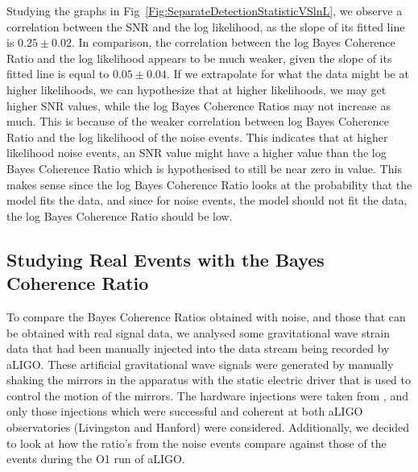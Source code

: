 \documentclass{article}
\begin{document}
     Studying the graphs in Fig~\ref{Fig:SeparateDetectionStatisticVSlnL}, we observe a correlation between the SNR and the log likelihood, as the slope of its fitted line is $0.25\pm0.02$. In comparison, the correlation between the log Bayes Coherence Ratio and the log likelihood appears to be much weaker, given the slope of its fitted line is equal to $0.05\pm0.04$. If we extrapolate for what the data might be at higher likelihoods, we can hypothesize that at higher likelihoods, we may get higher SNR values, while the log Bayes Coherence Ratios may not increase as much. This is because of the weaker correlation between log Bayes Coherence Ratio and the log likelihood of the noise events. This indicates that at higher likelihood noise events, an SNR value might have a higher value than the log Bayes Coherence Ratio which is hypothesised to still be near zero in value. This makes sense since the log Bayes Coherence Ratio looks at the probability that the model fits the data, and since for noise events, the model should not fit the data, the log Bayes Coherence Ratio should be low.  \\ 
     
     
%         
%         
 





 
 
 \subsection{Studying Real Events with the Bayes Coherence Ratio}
 
 
 
 To compare the Bayes Coherence Ratios obtained with noise, and those that can be obtained with real signal data, we analysed some gravitational wave strain data that had been manually injected into the data stream being recorded by aLIGO. These artificial gravitational wave signals were generated by manually shaking the mirrors in the apparatus with the static electric driver that is used to control the motion of the mirrors. The hardware injections were taken from \cite{hardwareInj}, and only those injections which were successful and coherent at both aLIGO observatories (Livingston and Hanford) were considered. Additionally, we decided to look at how the ratio's from the noise events compare against those of the events during the O1 run of aLIGO.\\
 
\end{document}
